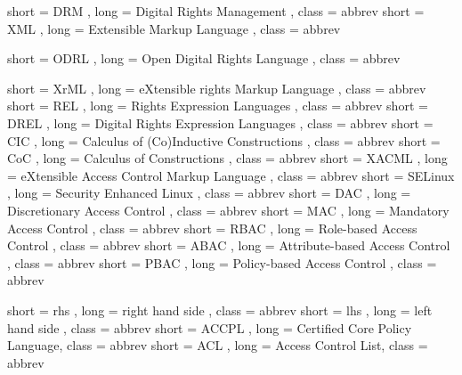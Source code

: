{
  short = DRM ,
  long  = Digital Rights Management ,
  class = abbrev
}
{
  short = XML ,
  long  = Extensible Markup Language ,
  class = abbrev
}

{
  short = ODRL ,
  long  = Open Digital Rights Language ,
  class = abbrev
}

{
  short = XrML ,
  long  = eXtensible rights Markup Language ,
  class = abbrev
}
{
  short = REL ,
  long  = Rights Expression Languages ,
  class = abbrev
}
{
  short = DREL ,
  long  = Digital Rights Expression Languages ,
  class = abbrev
}
{
  short = CIC ,
  long  = Calculus of (Co)Inductive Constructions ,
  class = abbrev
}
{
  short = CoC ,
  long  = Calculus of Constructions ,
  class = abbrev
}
{
  short = XACML ,
  long  = eXtensible Access Control Markup Language ,
  class = abbrev
}
{
  short = SELinux ,
  long  = Security Enhanced Linux ,
  class = abbrev
}
{
  short = DAC ,
  long  = Discretionary Access Control ,
  class = abbrev
}
{
  short = MAC ,
  long  = Mandatory Access Control ,
  class = abbrev
}
{
  short = RBAC ,
  long  = Role-based Access Control ,
  class = abbrev
}
{
  short = ABAC ,
  long  = Attribute-based Access Control ,
  class = abbrev
}
{
  short = PBAC ,
  long  = Policy-based Access Control ,
  class = abbrev
}

{
  short = rhs ,
  long  = right hand side ,
  class = abbrev
}
{
  short = lhs ,
  long  = left hand side ,
  class = abbrev
}
{
  short = ACCPL ,
  long  =  Certified Core Policy Language,
  class = abbrev
}
{
  short = ACL ,
  long  =  Access Control List,
  class = abbrev
}


